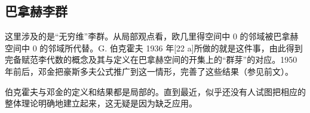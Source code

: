 \subsection{巴拿赫李群}

这里涉及的是“无穷维”李群。从局部观点看，欧几里得空间中 0 的邻域被巴拿赫空间中 0 的邻域所代替。G. 伯克霍夫 1936 年{[}22 a{]}所做的就是这件事，由此得到完备赋范李代数的概念及其与定义在巴拿赫空间的开集上的“群芽”的对应。1950 年前后，邓金把豪斯多夫公式推广到这一情形，完善了这些结果（参见前文）。

伯克霍夫与邓金的定义和结果都是局部的。直到最近，似乎还没有人试图把相应的整体理论明确地建立起来，这无疑是因为缺乏应用。
\relax{}
